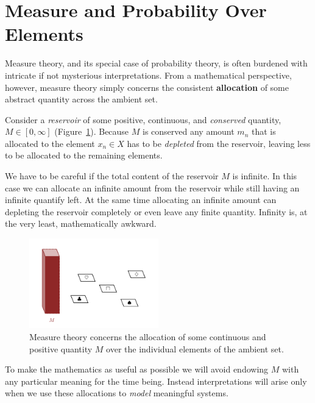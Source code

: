 \documentclass[
  letterpaper,
  DIV=11,
  numbers=noendperiod]{scrartcl}
\begin{document}
\hypertarget{measure-and-probability-over-elements}{%
\section{Measure and Probability Over
Elements}\label{measure-and-probability-over-elements}}

Measure theory, and its special case of probability theory, is often
burdened with intricate if not mysterious interpretations. From a
mathematical perspective, however, measure theory simply concerns the
consistent \textbf{allocation} of some abstract quantity across the
ambient set.

Consider a \emph{reservoir} of some positive, continuous, and
\emph{conserved} quantity, \(M \in [0, \infty]\)
(Figure~\ref{fig-reservoir}). Because \(M\) is conserved any amount
\(m_{n}\) that is allocated to the element \(x_{n} \in X\) has to be
\emph{depleted} from the reservoir, leaving less to be allocated to the
remaining elements.

We have to be careful if the total content of the reservoir \(M\) is
infinite. In this case we can allocate an infinite amount from the
reservoir while still having an infinite quantify left. At the same time
allocating an infinite amount can depleting the reservoir completely or
even leave any finite quantity. Infinity is, at the very least,
mathematically awkward.

\begin{figure}

{\centering \includegraphics[width=0.5\textwidth,height=\textheight]{figures/allocations/0/0.pdf}

}

\caption{\label{fig-reservoir}Measure theory concerns the allocation of
some continuous and positive quantity \(M\) over the individual elements
of the ambient set.}

\end{figure}

To make the mathematics as useful as possible we will avoid endowing
\(M\) with any particular meaning for the time being. Instead
interpretations will arise only when we use these allocations to
\emph{model} meaningful systems.
\end{document}
